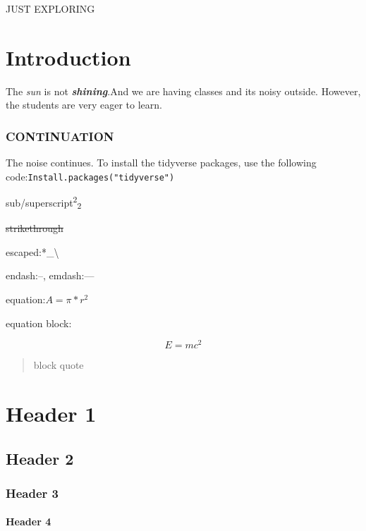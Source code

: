 \documentclass[
]{article}
\author{}
\date{\vspace{-2.5em}}
\begin{document}
JUST EXPLORING

\hypertarget{introduction}{%
\section{Introduction}\label{introduction}}

The \emph{sun} is not \textbf{\emph{shining}}.And we are having classes
and its noisy outside. However, the students are very eager to learn.

\hypertarget{continuation}{%
\subsubsection{CONTINUATION}\label{continuation}}

The noise continues. To install the tidyverse packages, use the
following code:\texttt{Install.packages("tidyverse")}

sub/superscript\textsuperscript{2}\textsubscript{2}

\sout{strikethrough}

escaped:*\_\textbackslash{}

endash:--, emdash:---

equation:\(A=\pi*r^{2}\)

equation block:

\[E=mc^{2}\]

\begin{quote}
block quote
\end{quote}

\hypertarget{anchor}{%
\section{Header 1}\label{anchor}}

\hypertarget{css_id}{%
\subsection{Header 2}\label{css_id}}

\hypertarget{header-3}{%
\subsubsection{Header 3}\label{header-3}}

\hypertarget{header-4}{%
\paragraph{Header 4}\label{header-4}}
\end{document}
